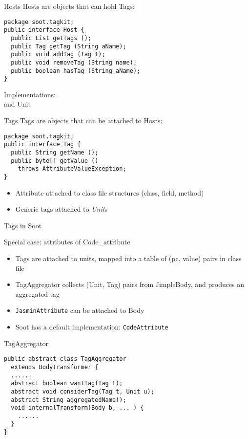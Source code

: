 \begin{slide}{Hosts}
{\red Host}s are objects that can hold {\red Tag}s:
{\small
\begin{verbatim}
package soot.tagkit;
public interface Host {
  public List getTags ();
  public Tag getTag (String aName); 
  public void addTag (Tag t); 
  public void removeTag (String name); 
  public boolean hasTag (String aName); 
}   
\end{verbatim}
}
Implementations:\\
 and {\small Unit}
\end{slide}

\begin{slide}{Tags}
{\red Tag}s are objects that can be attached to {\red Host}s:
\small{
\begin{verbatim}
package soot.tagkit;
public interface Tag {
  public String getName ();  
  public byte[] getValue () 
    throws AttributeValueException; 
}
\end{verbatim}
}
\begin{itemize}
\item {\red Attribute} attached to class file structures (class, field, method)
\item Generic tags attached to {\em Unit}s
\end{itemize}
\end{slide}

\begin{slide}{Tags in Soot}
\end{slide}

\begin{slide}{Special case: attributes of Code\_attribute}
\begin{itemize}
\item Tags are attached to units, mapped into a table of (pc, value) pairs
      in class file
\item {\red TagAggregator} collects (Unit, Tag) pairs from JimpleBody, and
      produces an aggregated tag 
\item {\tt JasminAttribute} can be attached to Body
\item Soot has a default implementation: {\tt CodeAttribute}
\end{itemize}
\end{slide}

\begin{slide}{TagAggregator}
{\small
\begin{verbatim}
public abstract class TagAggregator 
  extends BodyTransformer {
  ......
  abstract boolean wantTag(Tag t);
  abstract void considerTag(Tag t, Unit u);
  abstract String aggregatedName();
  void internalTransform(Body b, ... ) { 
    ...... 
  }
}
\end{verbatim}
}
\end{slide}

